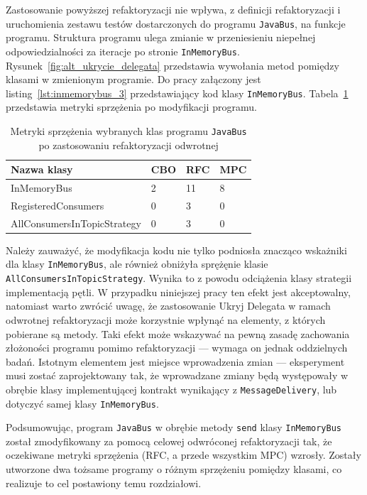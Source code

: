 Zastosowanie powyższej refaktoryzacji nie wpływa, z definicji refaktoryzacji i uruchomienia zestawu
testów dostarczonych do programu \texttt{JavaBus}, na funkcje programu.
Struktura programu ulega zmianie w przeniesieniu niepełnej odpowiedzialności za iteracje po stronie
\texttt{InMemoryBus}.
Rysunek~\ref{fig:alt_ukrycie_delegata} przedstawia wywołania metod pomiędzy klasami w zmienionym programie.
Do pracy załączony jest listing~\ref{lst:inmemorybus_3} przedstawiający kod klasy \texttt{InMemoryBus}.
Tabela~\ref{tab:metryki_javabus_alt} przedstawia metryki sprzężenia po modyfikacji programu.
\begin{table}[h]
    \centering
    \begin{tabular}{l|l|l|l}
        Nazwa klasy                 & CBO & RFC & MPC \\ \hline\hline
        InMemoryBus                 &   2 &  11 &   8 \\ \hline
        RegisteredConsumers         &   0 &   3 &   0 \\ \hline
        AllConsumersInTopicStrategy &   0 &   3 &   0
    \end{tabular}
    \caption{\label{tab:metryki_javabus_alt}Metryki sprzężenia wybranych klas programu \texttt{JavaBus} po zastosowaniu refaktoryzacji odwrotnej}
\end{table}

Należy zauważyć, że modyfikacja kodu nie tylko podniosła znacząco wskażniki dla klasy \texttt{InMemoryBus}, ale
również obniżyła sprężęnie klasie \texttt{AllConsumersInTopicStrategy}.
Wynika to z powodu odciążenia klasy strategii implementacją pętli.
W przypadku niniejszej pracy ten efekt jest akceptowalny, natomiast warto zwrócić uwagę, że zastosowanie Ukryj
Delegata w ramach odwrotnej refaktoryzacji może korzystnie wpłynąć na elementy, z których pobierane są metody.
Taki efekt może wskazywać na pewną zasadę zachowania złożoności programu pomimo refaktoryzacji --- wymaga on jednak
oddzielnych badań.
Istotnym elementem jest miejsce wprowadzenia zmian --- eksperyment musi zostać zaprojektowany tak, że wprowadzane
zmiany będą występowały w obrębie klasy implementującej kontrakt wynikający z \texttt{MessageDelivery}, lub dotyczyć
samej klasy \texttt{InMemoryBus}.

Podsumowując, program \texttt{JavaBus} w obrębie metody \texttt{send} klasy \texttt{InMemoryBus} został zmodyfikowany
za pomocą celowej odwróconej refaktoryzacji tak, że oczekiwane metryki sprzężenia (RFC, a przede wszystkim MPC) wzrosły.
Zostały utworzone dwa tożsame programy o różnym sprzężeniu pomiędzy klasami, co realizuje to cel postawiony temu
rozdziałowi.

